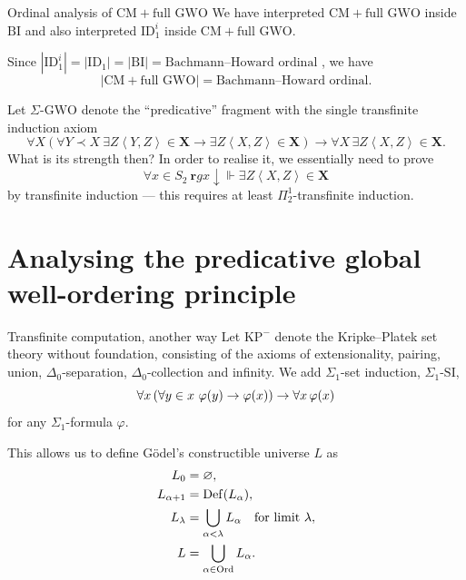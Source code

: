 \documentclass{beamer}
\newcommand{\tuple}[1]{\left\langle #1 \right\rangle}
\begin{document}
\begin{frame}{Ordinal analysis of $\mathrm{CM} + \text{full $\mathrm{GWO}$}$}
  We have interpreted $\mathrm{CM} + \text{full $\mathrm{GWO}$}$ inside $\mathrm{BI}$ and also interpreted $\mathrm{ID}_1^i$ inside $\mathrm{CM} + \text{full $\mathrm{GWO}$}$.

  \vspace{0.6em}

  Since $\left|\mathrm{ID}_1^i\right| = \left|\mathrm{ID}_1\right| = \left|\mathrm{BI}\right| = \text{Bachmann--Howard ordinal}$ \cite{buchholz-pohlers78-iterated-id}, we have
  \[\left|\mathrm{CM} + \text{full $\mathrm{GWO}$}\right| = \text{Bachmann--Howard ordinal}.\]

  \pause

  Let $\Sigma\text{-}\mathrm{GWO}$ denote the ``predicative'' fragment with the single transfinite induction axiom
  \[\forall X \left(\forall Y \prec X \ \exists Z \tuple{Y, Z} \in \mathbf{X} \rightarrow \exists Z \tuple{X, Z} \in \mathbf{X}\right) \rightarrow \forall X \, \exists Z \tuple{X, Z} \in \mathbf{X}.\]
  What is its strength then? \pause In order to realise it, we essentially need to prove
  \[\forall x \in S_2 \ \mathbf{r} gx {\downarrow} \Vdash \exists Z \tuple{X, Z} \in \mathbf{X}\]
  by transfinite induction --- this requires at least $\Pi^1_2$-transfinite induction.
\end{frame}

\section{Analysing the predicative global well-ordering principle}

\begin{frame}{Transfinite computation, another way}
  Let $\mathrm{KP}^-$ denote the Kripke--Platek set theory without foundation, consisting of the axioms of extensionality, pairing, union, $\Delta_0$-separation, $\Delta_0$-collection and infinity. We add $\Sigma_1$-set induction, $\Sigma_1\text{-}\mathrm{SI}$,
  \[\forall x \left(\forall y \in x \ \varphi\mleft(y\mright) \rightarrow \varphi\mleft(x\mright)\right) \rightarrow \forall x \, \varphi\mleft(x\mright)\]
  for any $\Sigma_1$-formula $\varphi$.

  \vspace{0.6em}

  This allows us to define G\"odel's constructible universe $L$ as
  \begin{align*}
    L_0            & = \varnothing,                                                          \\
    L_{\alpha + 1} & = \mathrm{Def}\mleft(L_\alpha\mright),                                  \\
    L_\lambda      & = \bigcup_{\alpha < \lambda} L_\alpha \quad \text{for limit $\lambda$}, \\
    L              & = \bigcup_{\alpha \in \mathrm{Ord}} L_\alpha.
  \end{align*}
\end{frame}
\end{document}
